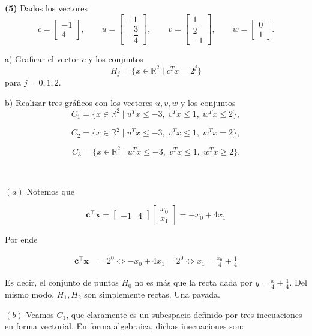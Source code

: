 \documentclass[12pt]{article}
\begin{document}
\begin{myframe}
    \textbf{(5)} Dados los vectores
\[
c=
\begin{bmatrix}
-1\\
4
\end{bmatrix},
\qquad
u=
\begin{bmatrix}
-1\\
-\dfrac{3}{4}
\end{bmatrix},
\qquad
v=
\begin{bmatrix}
\dfrac{1}{2}\\
-1
\end{bmatrix},
\qquad
w=
\begin{bmatrix}
0\\
1
\end{bmatrix}.
\]

a) Graficar el vector \(c\) y los conjuntos
\[
H_j=\{x\in\mathbb{R}^2\mid c^T x=2^j\}
\]
para \(j=0,1,2\).

b) Realizar tres gráficos con los vectores \(u,v,w\) y los conjuntos
\[
C_1=
\{x\in\mathbb{R}^2\mid
u^T x\le -3,\;
v^T x\le 1,\;
w^T x\le 2\},
\]

\[
C_2=
\{x\in\mathbb{R}^2\mid
u^T x\le -3,\;
v^T x\le 1,\;
w^T x=2\},
\]

\[
C_3=
\{x\in\mathbb{R}^2\mid
u^T x\le -3,\;
v^T x\le 1,\;
w^T x\ge 2\}.
\]
\end{myframe}

~

$(a)$ Notemos que 

\begin{equation*}
    \textbf{c}^\top \textbf{x} = \begin{bmatrix} 
        -1 & 4 
    \end{bmatrix} \begin{bmatrix} 
            x_0 \\ x_1 
    \end{bmatrix} = -x_0 + 4x_1
\end{equation*}

Por ende 

\begin{align*}
    \textbf{c}^\top \textbf{x} &= 2^0 \iff -x_0 + 4x_1 = 2^0 \iff x_1 =
    \frac{x_0}{4} + \frac{1}{4}
\end{align*}

Es decir, el conjunto de puntos $H_0$ no es más que la recta dada por $y =
\frac{x}{4} + \frac{1}{4}$. Del mismo modo, $H_1, H_2$ son simplemente rectas. Una pavada.

$(b)$ Veamos $C_1$, que claramente es un subespacio definido por tres
inecuaciones en forma vectorial. En forma algebraica, dichas inecuaciones son:
\end{document}
